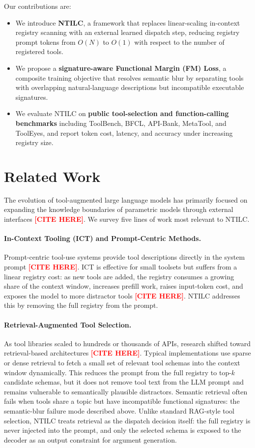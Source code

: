 \documentclass{article}
\newcommand{\placeholder}[1]{\textcolor{red}{\textbf{[#1]}}}
\begin{document}
Our contributions are:
\begin{itemize}[leftmargin=*,nosep]
    \item We introduce \textbf{NTILC}, a framework that replaces linear-scaling in-context registry scanning with an external learned dispatch step, reducing registry prompt tokens from $O(N)$ to $O(1)$ with respect to the number of registered tools.
    \item We propose a \textbf{signature-aware Functional Margin (FM) Loss}, a composite training objective that resolves semantic blur by separating tools with overlapping natural-language descriptions but incompatible executable signatures.
    \item We evaluate NTILC on \textbf{public tool-selection and function-calling benchmarks} including ToolBench, BFCL, API-Bank, MetaTool, and ToolEyes, and report token cost, latency, and accuracy under increasing registry size.
\end{itemize}

\section{Related Work}

The evolution of tool-augmented large language models has primarily focused on expanding the knowledge boundaries of parametric models through external interfaces \placeholder{CITE HERE}.
We survey five lines of work most relevant to NTILC.

\paragraph{In-Context Tooling (ICT) and Prompt-Centric Methods.}
Prompt-centric tool-use systems provide tool descriptions directly in the system prompt \placeholder{CITE HERE}.
ICT is effective for small toolsets but suffers from a linear registry cost: as new tools are added, the registry consumes a growing share of the context window, increases prefill work, raises input-token cost, and exposes the model to more distractor tools \placeholder{CITE HERE}.
NTILC addresses this by removing the full registry from the prompt.

\paragraph{Retrieval-Augmented Tool Selection.}
As tool libraries scaled to hundreds or thousands of APIs, research shifted toward retrieval-based architectures \placeholder{CITE HERE}.
Typical implementations use sparse or dense retrieval to fetch a small set of relevant tool schemas into the context window dynamically.
This reduces the prompt from the full registry to top-$k$ candidate schemas, but it does not remove tool text from the LLM prompt and remains vulnerable to semantically plausible distractors.
Semantic retrieval often fails when tools share a topic but have incompatible functional signatures: the semantic-blur failure mode described above.
Unlike standard RAG-style tool selection, NTILC treats retrieval as the dispatch decision itself: the full registry is never injected into the prompt, and only the selected schema is exposed to the decoder as an output constraint for argument generation.
\end{document}
